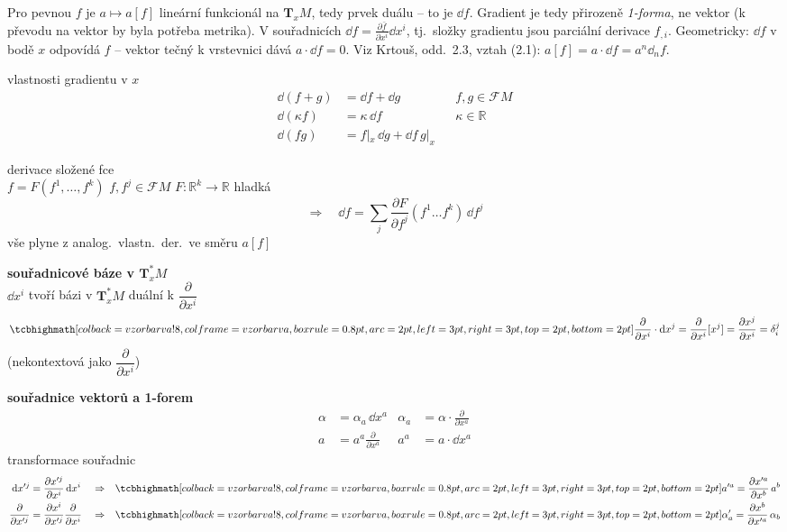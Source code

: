 \begin{vysvetleni}[Gradient]
Pro pevnou $f$ je $a\mapsto a[f]$ lineární funkcionál na $\mathbf{T}_xM$, tedy prvek duálu -- to je $\dd f$. Gradient je tedy přirozeně \emph{1-forma}, ne vektor (k převodu na vektor by byla potřeba metrika). V souřadnicích $\dd f=\frac{\partial\bar f}{\partial x^i}\dd x^i$, tj.\ složky gradientu jsou parciální derivace $f_{,i}$. Geometricky: $\dd f$ v bodě $x$ odpovídá  $f$ -- vektor tečný k vrstevnici dává $a\cdot\dd f=0$. Viz Krtouš, odd.~2.3, vztah (2.1): $a[f]=a\cdot\dd f=a^n\dd_n f$.
\end{vysvetleni}

vlastnosti gradientu v $x$
\begin{align*}
  \dd(f+g) &= \dd f + \dd g && f,g\in\mathcal{F}M \\
  \dd(\kappa f) &= \kappa\,\dd f && \kappa\in\mathbb{R} \\
  \dd(fg) &= f|_x\,\dd g + \dd f\,g|_x
\end{align*}

derivace složené fce \\
\quad $f = F(f^1,\dots,f^k)$ \qquad $f, f^j\in\mathcal{F}M$ \qquad $F:\mathbb{R}^k\to\mathbb{R}$ hladká
\[
  \Rightarrow\quad \dd f = \sum_j\frac{\partial F}{\partial f^j}(f^1\dots f^k)\,\dd f^j
\]
\quad vše plyne z analog.\ vlastn.\ der.\ ve směru $a[f]$

\textbf{souřadnicové báze v $\mathbf{T}^*_xM$} \\
\quad $\dd x^i$ tvoří bázi v $\mathbf{T}^*_xM$ duální k $\dfrac{\partial}{\partial x^i}$
\[
  \vzorec{\frac{\partial}{\partial x^i}\cdot\dd x^j = \frac{\partial}{\partial x^i}[x^j] = \frac{\partial x^j}{\partial x^i} = \delta^j_i}
\]
\quad {} (nekontextová jako $\dfrac{\partial}{\partial x^i}$)

\textbf{souřadnice vektorů a 1-forem}
\begin{align*}
  \alpha &= \alpha_a\,\dd x^a & \alpha_a &= \alpha\cdot\frac{\partial}{\partial x^a} \\
  a &= a^a\frac{\partial}{\partial x^a} & a^a &= a\cdot\dd x^a
\end{align*}
\quad transformace souřadnic
\begin{align*}
  \dd x'^j &= \frac{\partial x'^j}{\partial x^i}\,\dd x^i & &\Rightarrow & \vzorec{a'^a = \frac{\partial x'^a}{\partial x^b}\,a^b} \\
  \frac{\partial}{\partial x'^j} &= \frac{\partial x^i}{\partial x'^j}\frac{\partial}{\partial x^i} & &\Rightarrow & \vzorec{\alpha'_a = \frac{\partial x^b}{\partial x'^a}\,\alpha_b}
\end{align*}

